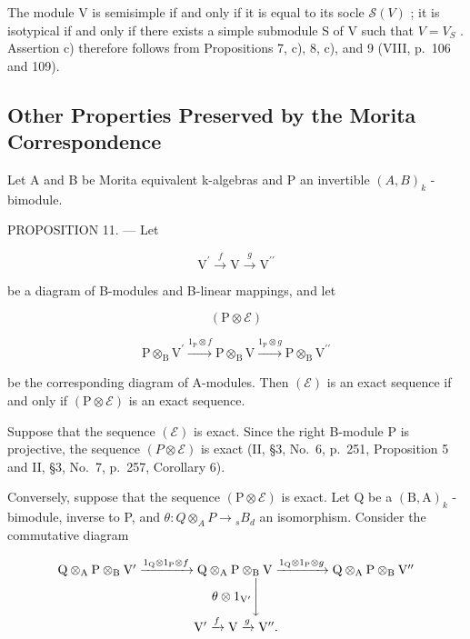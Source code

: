 The module V is semisimple if and only if it is equal to its socle \(\mathcal{S}(V)\) ; it is isotypical if and only if there exists a simple submodule S of V such that \(V = V_{S}\) . Assertion c) therefore follows from Propositions 7, c), 8, c), and 9 (VIII, p.~106 and 109).

\subsection{Other Properties Preserved by the Morita Correspondence}

Let A and B be Morita equivalent k-algebras and P an invertible \((A,B)_{k}\) -bimodule.

PROPOSITION 11. --- Let

\[
\mathrm{V} ^ {\prime} \xrightarrow {f} \mathrm{V} \xrightarrow {g} \mathrm{V} ^ {\prime \prime}\tag{ε}
\]

be a diagram of B-modules and B-linear mappings, and let

\[
(\mathrm{P} \otimes \mathcal {E})
\]

\[
\mathrm{P} \otimes_ {\mathrm{B}} \mathrm{V} ^ {\prime} \xrightarrow {1 _ {\mathrm{P}} \otimes f} \mathrm{P} \otimes_ {\mathrm{B}} \mathrm{V} \xrightarrow {1 _ {\mathrm{P}} \otimes g} \mathrm{P} \otimes_ {\mathrm{B}} \mathrm{V} ^ {\prime \prime}
\]

be the corresponding diagram of A-modules. Then \((\mathcal{E})\) is an exact sequence if and only if \((\mathrm{P} \otimes \mathcal{E})\) is an exact sequence.

Suppose that the sequence \((\mathcal{E})\) is exact. Since the right B-module P is projective, the sequence \((P \otimes \mathcal{E})\) is exact (II, §3, No.~6, p.~251, Proposition 5 and II, §3, No.~7, p.~257, Corollary 6).

Conversely, suppose that the sequence \((\mathrm{P} \otimes \mathcal{E})\) is exact. Let Q be a \((\mathrm{B}, \mathrm{A})_{k}\) -bimodule, inverse to P, and \(\theta : Q \otimes_{A} P \to {}_{s} B_{d}\) an isomorphism. Consider the commutative diagram

\[
\begin{array}{c} \mathrm{Q} \otimes_ {\mathrm{A}} \mathrm{P} \otimes_ {\mathrm{B}} \mathrm{V} ^ {\prime} \xrightarrow {1 _ {\mathrm{Q}} \otimes 1 _ {\mathrm{P}} \otimes f} \mathrm{Q} \otimes_ {\mathrm{A}} \mathrm{P} \otimes_ {\mathrm{B}} \mathrm{V} \xrightarrow {1 _ {\mathrm{Q}} \otimes 1 _ {\mathrm{P}} \otimes g} \mathrm{Q} \otimes_ {\mathrm{A}} \mathrm{P} \otimes_ {\mathrm{B}} \mathrm{V} ^ {\prime \prime} \\ \theta \otimes 1 _ {\mathrm{V} ^ {\prime}} \Biggl \downarrow \\ \mathrm{V} ^ {\prime} \xrightarrow {f} \mathrm{V} \xrightarrow {g} \mathrm{V} ^ {\prime \prime}. \end{array}
\]

